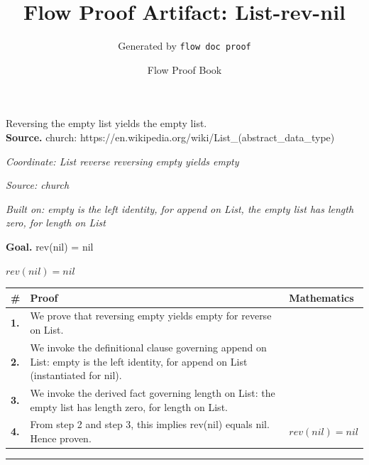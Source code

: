 \documentclass[11pt]{article}
\title{Flow Proof Artifact: List-rev-nil}
\author{Generated by \texttt{flow doc proof}}
\date{Flow Proof Book}
\theoremstyle{definition}
\begin{document}
\maketitle
Reversing the empty list yields the empty list.\\[0.5em]
\textbf{Source.} church: https://en.wikipedia.org/wiki/List\_(abstract\_data\_type)\\[0.5em]
\bigskip
{}\par
\smallskip\noindent\textit{Coordinate: List \cdot reverse \cdot reversing empty yields empty}\par
\smallskip\noindent\textit{Source: church}\par
\smallskip\noindent\textit{Built on: empty is the left identity, for append on List, the empty list has length zero, for length on List}\par
\medskip
\noindent\textbf{Goal.} rev(nil) = nil\par
\noindent$\displaystyle rev(nil) = nil$\par
\medskip
\noindent
\begin{tabular}{@{} >{\raggedright\arraybackslash}p{} >{\raggedright\arraybackslash}p{} >{\raggedleft\arraybackslash}p{} @{}}
\textbf{\#} & \textbf{Proof} & \textbf{Mathematics} \\
\midrule
\textbf{1.} & We prove that reversing empty yields empty for reverse on List. & \\[0.45em]
\textbf{2.} & We invoke the definitional clause governing append on List: empty is the left identity, for append on List (instantiated for nil). & \\[0.45em]
\textbf{3.} & We invoke the derived fact governing length on List: the empty list has length zero, for length on List. & \\[0.45em]
\textbf{4.} & From step 2 and step 3, this implies rev(nil) equals nil. Hence proven. & $\displaystyle rev(nil) = nil$ \\[0.45em]
\bottomrule
\end{tabular}
\label{thm:List-reverse-reversing_empty_yields_empty}
\par\medskip\hrule
\end{document}
